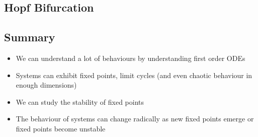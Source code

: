
\begin{slide}
\section{Hopf Bifurcation}

\pause
\pb {}
\begin{center}
  \pause
\end{center}
\end{slide}



\begin{slide}
\section{Summary}

\begin{PauseHighLight}
  \begin{itemize}
  \item We can understand a lot of behaviours by understanding first
    order ODEs\pause
  \item Systems can exhibit fixed points, limit cycles (and even chaotic
    behaviour in enough dimensions)\pause
  \item We can study the stability of fixed points\pause
  \item The behaviour of systems can change radically as new fixed
    points emerge or fixed points become unstable\pause
  \end{itemize}
\end{PauseHighLight}

\end{slide}

